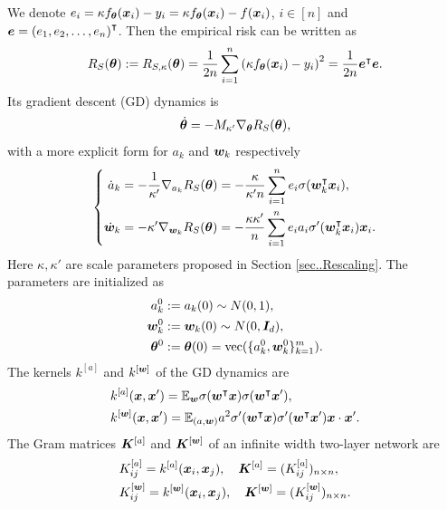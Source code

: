 \documentclass{article}
\begin{document}
We denote $e_i = \kappa f_{\bm{\theta}}(\bm{x}_i) - y_i = \kappa f_{\bm{\theta}}(\bm{x}_i) - f(\bm{x}_i)$, $i\in[n]$ and $\bm{e} = {(e_1, e_2, \ldots, e_n)}^{\intercal}$. Then the empirical risk can be written as
\begin{equation}
    R_S(\bm{\theta}):=R_{S,\kappa}(\bm{\theta}) = \frac{1}{2n}\sum_{i=1}^n{\left(\kappa f_{\bm{\theta}}(\bm{x}_i)-y_i\right)}^2 = \frac{1}{2n}\bm{e}^{\intercal}\bm{e}.
\end{equation}
Its gradient descent (GD) dynamics is
\begin{equation}\label{eqn:gd_dyn}
    \dot{\bm{\theta}} = -M_{\kappa'}\nabla_{\bm{\theta}}R_S(\bm{\theta}),
\end{equation}
with a more explicit form for $a_k$ and $\bm{w}_k$ respectively
\begin{equation}
    \left \{
    \begin{aligned}
        \dot{a}_k   & = -\frac{1}{\kappa'}\nabla_{a_k}R_S(\bm{\theta}) = -\frac{\kappa}{\kappa'n}\sum_{i=1}^{n}e_i\sigma(\bm{w}_k^\intercal\bm{x}_i), \\
        \dot{\bm{w}}_k & =-\kappa'\nabla_{\bm{w}_k}R_S(\bm{\theta}) = -\frac{\kappa\kappa'}{n}\sum_{i=1}^n e_i a_i\sigma'(\bm{w}_k^\intercal\bm{x}_i)\bm{x}_i.
    \end{aligned}
    \right.\label{eq..MainDynamics}
\end{equation}
Here $\kappa,\kappa'$ are scale parameters proposed in Section \ref{sec..Rescaling}.
The parameters are initialized as
\begin{align}
    a^0_k     & :=a_k(0)\sim N(0,1),                            \\
    \bm{w}_k^0   & :=\bm{w}_k(0)\sim N(0,\bm{I}_d),                      \\
    \bm{\theta}^0 & := \bm{\theta}(0) = \mathrm{vec}(\{a_k^0, \bm{w}_k^0\}_{k=1}^m).\label{eq..MainInitialization}
\end{align}
The kernels $k^{[a]}$ and $k^{[\bm{w}]}$ of the GD dynamics are
\begin{equation}
    \begin{aligned}
         & k^{[a]}(\bm{x},\bm{x}')=\mathbb{E}_{\bm{w}}\sigma(\bm{w}^\intercal\bm{x})\sigma(\bm{w}^\intercal\bm{x}'),                        \\
         & k^{[\bm{w}]}(\bm{x},\bm{x}')=\mathbb{E}_{(a,\bm{w})}a^2\sigma'(\bm{w}^\intercal\bm{x})\sigma'(\bm{w}^\intercal\bm{x}')\bm{x}\cdot\bm{x}'. \\
    \end{aligned}
\end{equation}
The Gram matrices $\bm{K}^{[a]}$ and $\bm{K}^{[\bm{w}]}$ of an infinite width two-layer network are
\begin{equation}
    \begin{aligned}
         & K^{[a]}_{ij}=k^{[a]}(\bm{x}_i,\bm{x}_j), \quad \bm{K}^{[a]}=(K_{ij}^{[a]})_{n\times n},         \\
         & K^{[\bm{w}]}_{ij}=k^{[\bm{w}]}(\bm{x}_i,\bm{x}_j), \quad \bm{K}^{[\bm{w}]}=(K_{ij}^{[\bm{w}]})_{n\times n}.
    \end{aligned}
\end{equation}
\end{document}
